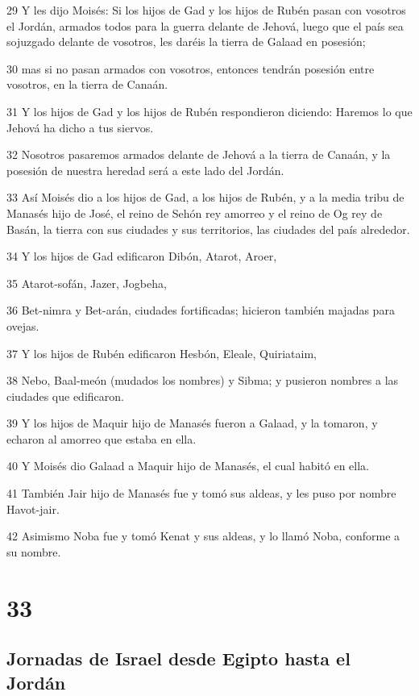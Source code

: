 \par 29 Y les dijo Moisés: Si los hijos de Gad y los hijos de Rubén pasan con vosotros el Jordán, armados todos para la guerra delante de Jehová, luego que el país sea sojuzgado delante de vosotros, les daréis la tierra de Galaad en posesión;
\par 30 mas si no pasan armados con vosotros, entonces tendrán posesión entre vosotros, en la tierra de Canaán.
\par 31 Y los hijos de Gad y los hijos de Rubén respondieron diciendo: Haremos lo que Jehová ha dicho a tus siervos.
\par 32 Nosotros pasaremos armados delante de Jehová a la tierra de Canaán, y la posesión de nuestra heredad será a este lado del Jordán.
\par 33 Así Moisés dio a los hijos de Gad, a los hijos de Rubén, y a la media tribu de Manasés hijo de José, el reino de Sehón rey amorreo y el reino de Og rey de Basán, la tierra con sus ciudades y sus territorios, las ciudades del país alrededor. 
\par 34 Y los hijos de Gad edificaron Dibón, Atarot, Aroer,
\par 35 Atarot-sofán, Jazer, Jogbeha,
\par 36 Bet-nimra y Bet-arán, ciudades fortificadas; hicieron también majadas para ovejas.
\par 37 Y los hijos de Rubén edificaron Hesbón, Eleale, Quiriataim,
\par 38 Nebo, Baal-meón (mudados los nombres) y Sibma; y pusieron nombres a las ciudades que edificaron.
\par 39 Y los hijos de Maquir hijo de Manasés fueron a Galaad, y la tomaron, y echaron al amorreo que estaba en ella.
\par 40 Y Moisés dio Galaad a Maquir hijo de Manasés, el cual habitó en ella.
\par 41 También Jair hijo de Manasés fue y tomó sus aldeas, y les puso por nombre Havot-jair.
\par 42 Asimismo Noba fue y tomó Kenat y sus aldeas, y lo llamó Noba, conforme a su nombre.

\chapter{33}

\section*{Jornadas de Israel desde Egipto hasta el Jordán}

